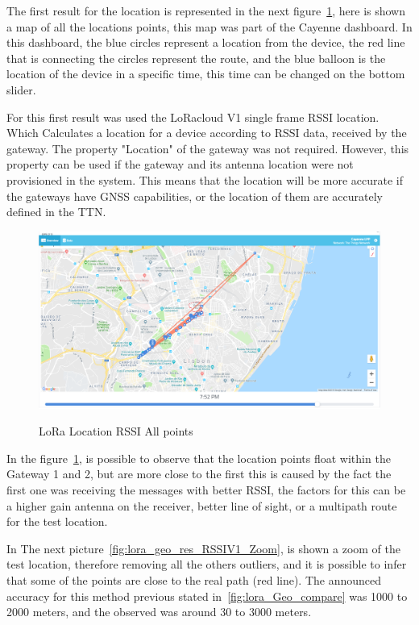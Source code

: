   
The first result for the location is represented in the next figure~\ref{fig:lora_geo_res_rssiv1}, here is shown a map of all the locations points, this map was part of the Cayenne dashboard. In this dashboard, the blue circles represent a location from the device, the red line that is connecting the circles represent the route, and the blue balloon is the location of the device in a specific time, this time can be changed on the bottom slider.

For this first result was used the LoRacloud V1 single frame RSSI location. Which Calculates a location for a device according to RSSI data, received by the gateway. The property "Location" of the gateway was not required. However, this property can be used if the gateway and its antenna location were not provisioned in the system. This means that the location will be more accurate if the gateways have GNSS capabilities, or the location of them are accurately defined in the TTN.
 
\begin{figure}[htbp]
  \centering
  
    {\includegraphics[width=0.8\linewidth]{Chapters/Figures/lorageores21-2.PNG}}%
 
  \caption{LoRa Location RSSI All points}
  \label{fig:lora_geo_res_rssiv1}
\end{figure}

In the figure~\ref{fig:lora_geo_res_rssiv1}, is possible to observe that the location points float within the Gateway 1 and 2, but are more close to the first this is caused by the fact the first one was receiving the messages with better RSSI, the factors for this can be a higher gain antenna on the receiver, better line of sight, or a multipath route for the test location. 

In The next picture~\ref{fig:lora_geo_res_RSSIV1_Zoom}, is shown a zoom of the test location, therefore removing all the others outliers, and it is possible to infer that some of the points are close to the real path (red line). The announced accuracy for this method previous stated in~\ref{fig:lora_Geo_compare} was 1000 to 2000 meters, and the observed was around 30 to 3000 meters.

